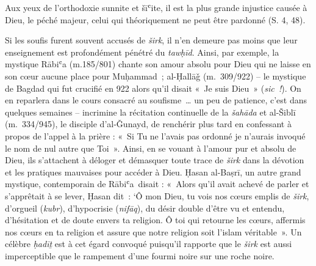 Aux yeux de l'orthodoxie sunnite et šīʿite, il est la plus grande
injustice causée à Dieu, le péché majeur, celui qui théoriquement ne
peut être pardonné (S. 4, 48).

Si les soufis furent souvent accusés de \emph{širk}, il n'en demeure pas
moins que leur enseignement est profondément pénétré du \emph{tawḥīd}.
Ainsi, par exemple, la mystique Rābiʿa (m.185/801) chante son amour
absolu pour Dieu qui ne laisse en son cœur aucune place pour
Muḥammad~; al-Ḥallāǧ (m.~309/922) -- le
mystique de Bagdad qui fut crucifié en 922 alors qu'il disait «~Je suis
Dieu~» (\emph{sic~!}). On en reparlera dans le cours consacré au
soufisme~\ldots{} un peu de patience, c'est dans quelques semaines --
incrimine la récitation continuelle de la \emph{šahāda} et al-Šiblī (m.~334/945), le disciple
d'al-Ǧunayd, de renchérir plus tard en confessant à propos de l'appel à
la prière : «~Si Tu ne l'avais pas ordonné je n'aurais invoqué le nom de
nul autre que Toi~». Ainsi, en se vouant à l'amour pur et absolu
de Dieu, ils s'attachent à déloger et démasquer toute trace de
\emph{širk} dans la dévotion et les pratiques mauvaises pour accéder à
Dieu. Ḥasan al-Baṣrī, un autre grand mystique, contemporain de
Rābiʿa~disait : «~Alors qu'il avait achevé de parler et s'apprêtait à se
lever, Ḥasan dit~: `Ô mon Dieu, tu vois nos cœurs emplis de \emph{širk},
d'orgueil (\emph{kubr}), d'hypocrisie (\emph{nifāq}), du désir double
d'être vu et entendu, d'hésitation et de doute envers ta religion. Ô toi
qui retourne les cœurs, affermis nos cœurs en ta religion et assure que
notre religion soit l'islam véritable~». Un
célèbre \emph{ḥadīṯ} est à cet égard convoqué puisqu'il rapporte que le
\emph{širk} est aussi imperceptible que le rampement d'une fourmi noire
sur une roche noire.

